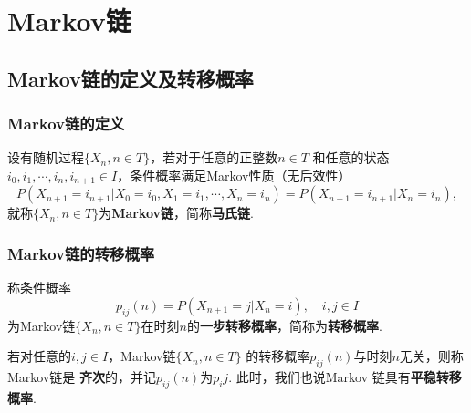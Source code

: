 \section{Markov链}

\subsection{Markov链的定义及转移概率}

\begin{frame}
    \frametitle{Markov链的定义}
    \begin{mydefinition}[Markov链]
        设有随机过程$\{X_n,n\in T\}$，若对于任意的正整数$n\in T$
        和任意的状态$i_0,i_1,\cdots,i_n,i_{n+1}\in I$，条件概率满足Markov性质（无后效性）
        \begin{equation}
            P(X_{n+1}=i_{n+1}|X_0=i_0,X_1=i_1,\cdots,X_n=i_n)=P(X_{n+1}=i_{n+1}|X_n=i_n),
        \end{equation}
        就称$\{X_n,n\in T\}$为\textbf{Markov链}，简称\textbf{马氏链}. 
    \end{mydefinition}
\end{frame}

\begin{frame}
    \frametitle{Markov链的转移概率}
    \begin{mydefinition}[Markov链的转移概率]
        称条件概率
        \begin{equation}
            p_{ij}(n)=P(X_{n+1}=j|X_n=i),\quad i,j\in I
        \end{equation}
        为Markov链$\{X_n,n\in T\}$在时刻$n$的\textbf{一步转移概率}，简称为\textbf{转移概率}. 
        
    \end{mydefinition}
    \begin{mydefinition}[齐次Markov链与平稳转移概率]
        若对任意的$i,j\in I$，Markov链$\{X_n,n\in T\}$
        的转移概率$p_{ij}(n)$与时刻$n$无关，则称Markov链是
        \textbf{齐次}的，并记$p_{ij}(n)$为$p_ij$. 此时，我们也说Markov
        链具有\textbf{平稳转移概率}. 
    \end{mydefinition}
\end{frame}

